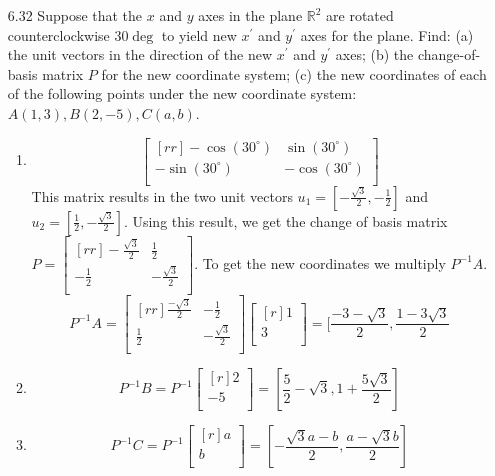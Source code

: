 \documentclass[12pt]{article}
\theoremstyle{definition}
\theoremstyle{plain}
\begin{document}
\begin{enumerate}
\item[6.32] Suppose that the $x$ and $y$ axes in the plane $\mathbb{R}^2$ are rotated counterclockwise $30\deg$ to yield new $x^\prime$ and $y^\prime$ axes for the plane. Find: (a) the unit vectors in the direction of the new $x^\prime$ and $y^\prime$ axes; (b) the change-of-basis matrix $P$ for the new coordinate system; (c) the new coordinates of each of the following points under the new coordinate system: $A(1,3), B(2,-5), C(a,b)$.
	\begin{enumerate}
	\item 
	\[ \begin{bmatrix}[rr]-\cos(30^{\circ} )&\sin(30^{\circ})\\-\sin(30^{\circ})&-\cos(30^{\circ})\\\end{bmatrix} \]
	This matrix results in the two unit vectors $u_1=[-\frac{\sqrt{3}}{2},-\frac{1}{2}]$ and $u_2=[\frac{1}{2},-\frac{\sqrt{3}}{2}]$. Using this result, we get the change of basis matrix $P=\begin{bmatrix}[rr]-\frac{\sqrt{3}}{2}&\frac{1}{2}\\-\frac{1}{2}&-\frac{\sqrt{3}}{2}\\\end{bmatrix}$. To get the new coordinates we multiply $P^{-1}A$.
	\[ P^{-1}A = \begin{bmatrix}[rr]\frac{-\sqrt{3}}{2}&-\frac{1}{2}\\\frac{1}{2}&-\frac{\sqrt{3}}{2}\\\end{bmatrix}\begin{bmatrix}[r]1\\3\\\end{bmatrix} = [\frac{-3-\sqrt{3}}{2}, \frac{1-3\sqrt{3}}{2} \]
	\item 
	\[ P^{-1}B = P^{-1}\begin{bmatrix}[r]2\\-5\\\end{bmatrix} = [\frac{5}{2}-\sqrt{3}, 1+\frac{5\sqrt{3}}{2}] \]
	\item
	\[ P^{-1}C = P^{-1}\begin{bmatrix}[r]a\\b\\\end{bmatrix} = [-\frac{\sqrt{3}a-b}{2}, \frac{a-\sqrt{3}b}{2}] \]
	\end{enumerate}
	

\end{enumerate}
\end{document}
